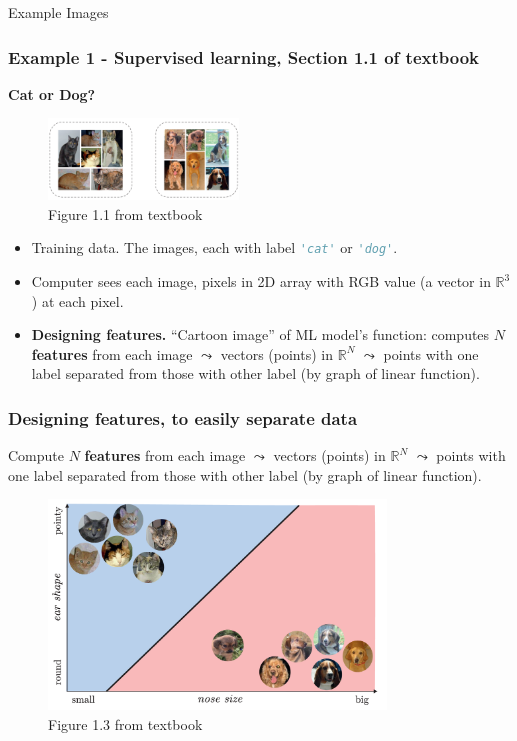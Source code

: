 \documentclass{beamer}
\theoremstyle{example}
\newcommand{\st}[1]{\lstinline[language=Python,basicstyle=\ttfamily,stringstyle=\small\color{strings}]!#1!}
\newcommand{\bb}[1]{\mathbb{#1}}
\begin{document}
\begin{frame}[standout]
    Example Images
\end{frame}

\begin{frame}
\frametitle{Example 1 - Supervised learning, Section 1.1 of textbook}
\textbf{Cat or Dog?}

\begin{figure}
\includegraphics[width=0.45\textwidth]{../../Images/Fig1-1.png}
\caption*{Figure 1.1 from textbook}
\end{figure}

\begin{itemize}
    \item Training data. The images, each with label \st{'cat'} or \st{'dog'}.
    \pause
    \item Computer sees each image, pixels in 2D array with RGB value (a vector in $\bb R^3$) at each pixel.
    \pause
    \item \textbf{Designing features.} ``Cartoon image'' of ML model's function: computes $N$ \textbf{features} from each image $\leadsto$ vectors (points) in $\bb R^N$ $\leadsto$ points with one label separated from those with other label (by graph of linear function).
\end{itemize}
\end{frame}

\begin{frame}
    \frametitle{Designing features, to easily separate data}
    Compute $N$ \textbf{features} from each image $\leadsto$ vectors (points) in $\bb R^N$ $\leadsto$ points with one label separated from those with other label (by graph of linear function).

    \begin{figure}
        \includegraphics[width=0.8\textwidth]{../../Images/Fig1-3.png}
    \caption*{Figure 1.3 from textbook}
    \end{figure}
\end{frame}
\end{document}
